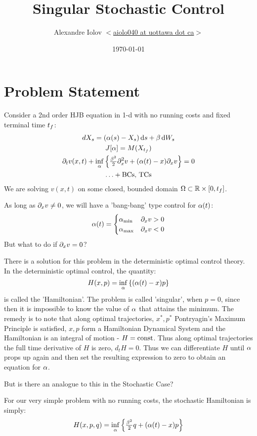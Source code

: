 \documentclass{article}
\begin{document}
\title{Singular Stochastic Control} \author{Alexandre Iolov 
$<$\href{mailto:aiolo040@uottawa.ca}
		{aiolo040 at uottawa dot ca}$>$}

\date{\today}

\maketitle


\section{Problem Statement}

Consider a 2nd order HJB equation in 1-d with no running costs and fixed
terminal time ${ t_f }$:
\begin{equation}
\begin{gathered}
dX_s =  ({\alpha}(s) - X_s) \, \mathrm{d} s + {\beta} \, \mathrm{d} W_s 
\\
J[{\alpha}] = M(X_{ t_f })
\\
{\partial}_t v(x,t) + \inf_{{\alpha}} \left\{ \tfrac{{\beta}^2}{2} {\partial}_x^2 v + 
({\alpha}(t) - x) {\partial}_x v \right\} = 0
\\
\ldots + \textrm{BCs, TCs}
\end{gathered}
\label{eq:HJB_singular}
\end{equation} 
We are solving $v(x,t)$ on some closed, bounded domain ${\Omega} \subset { \mathbb{R} } \times
[0,{ t_f }]$.

As long as ${\partial}_x v \neq 0$, we will have a 'bang-bang' type control for
${\alpha}(t)$:
\begin{equation}
{\alpha}(t) =
\begin{cases}
{ {\alpha}_{\textrm{min}} } & {\partial}_x v > 0
\\
{ {\alpha}_{\textrm{max}} } & {\partial}_x v < 0
\end{cases}
\end{equation}
But what to do if ${\partial}_x v= 0$?

There is a solution for this problem in the deterministic optimal control
theory. In the deterministic optimal control, the quantity:
$$
H(x,p) = \inf_{{\alpha}} \left\{
({\alpha}(t) - x) p \right\}
$$
is called the 'Hamiltonian'. The problem is called 'singular', when $p=0$, since
then it is impossible to know the value of ${\alpha}$ that attains the minimum. The
remedy is to note that along optimal trajectories, $x^*,p^*$ Pontryagin's
Maximum Principle is satisfied, $x,p$ form a Hamiltonian Dynamical System and
the Hamiltonian is an integral of motion - $H = { \mathrm{const} }$. Thus along optimal
trajectories the full time derivative of $H$ is zero, $d_t H=0$. Thus we can
differentiate $H$ until ${\alpha}$ props up again and then set the resulting
expression to zero to obtain an equation for ${\alpha}$. 

But is there an analogue to this in the Stochastic Case?

For our very simple problem with no running costs, the stochastic Hamiltonian
is simply:
$$
H(x,p,q) = \inf_{{\alpha}} \left\{\tfrac{{\beta}^2}{2} q +
({\alpha}(t) - x) p \right\}
$$




% 
\end{document}

